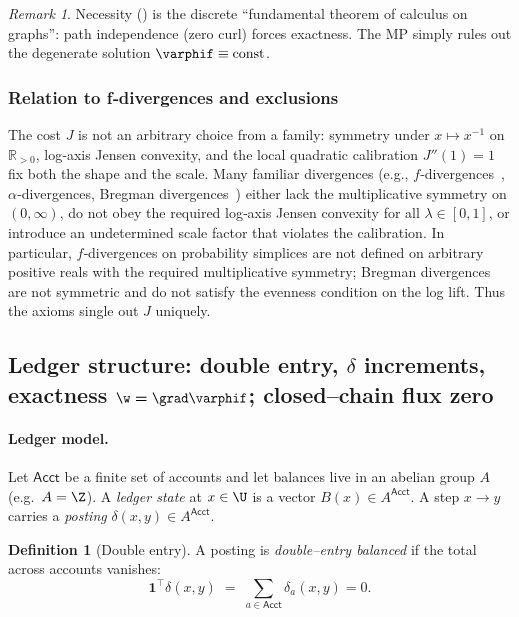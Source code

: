 \documentclass[12pt,a4paper]{article}
\theoremstyle{definition}
\newtheorem{definition}[theorem]{Definition}
\theoremstyle{remark}
\newtheorem{remark}[theorem]{Remark}
\begin{document}
\begin{remark}
Necessity () is the discrete ``fundamental theorem of calculus on graphs'': path independence (zero curl) forces exactness. The MP simply rules out the degenerate solution $\varphif\equiv\mathrm{const}$.
\end{remark}

\subsubsection*{Relation to f‑divergences and exclusions}
The cost $J$ is not an arbitrary choice from a family: symmetry under $x\mapsto x^{-1}$ on $\mathbb{R}_{>0}$, log‑axis Jensen convexity, and the local quadratic calibration $J''(1)=1$ fix both the shape and the scale. Many familiar divergences (e.g., $f$‑divergences~\cite{Csiszar1967,AmariNagaoka2000}, $\alpha$‑divergences, Bregman divergences~\cite{Bregman1967}) either lack the multiplicative symmetry on $(0,\infty)$, do not obey the required log‑axis Jensen convexity for all $\lambda\in[0,1]$, or introduce an undetermined scale factor that violates the calibration. In particular, $f$‑divergences on probability simplices are not defined on arbitrary positive reals with the required multiplicative symmetry; Bregman divergences are not symmetric and do not satisfy the evenness condition on the log lift. Thus the axioms single out $J$ uniquely.

\subsection{Ledger structure: double entry, $\delta$ increments, exactness $\boldsymbol{\w=\grad\varphif}$; closed--chain flux zero}
\label{subsec:ledger}

\paragraph{Ledger model.}
Let $\mathsf{Acct}$ be a finite set of accounts and let balances live in an abelian group $A$ (e.g.\ $A=\Z$). A \emph{ledger state} at $x\in\U$ is a vector $B(x)\in A^{\mathsf{Acct}}$. A step $x\to y$ carries a \emph{posting} $\delta(x,y)\in A^{\mathsf{Acct}}$.

\begin{definition}[Double entry]
A posting is \emph{double--entry balanced} if the total across accounts vanishes:
\[
  \mathbf{1}^\top \delta(x,y) \;=\; \sum_{a\in\mathsf{Acct}}\delta_a(x,y)=0.
\]
\end{definition}
\end{document}
